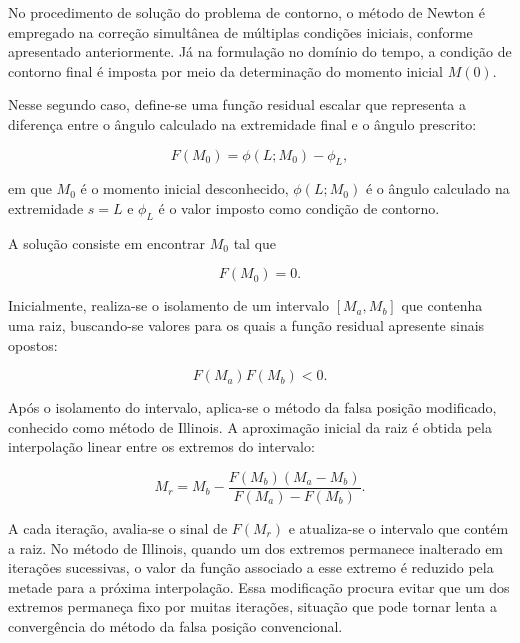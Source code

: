 \documentclass[arial,centeredequations,english,brazilian,oneside,section=TITLE]{ifes8}
\begin{document}
No procedimento de solução do problema de contorno, o método de
Newton é empregado na correção simultânea de múltiplas condições
iniciais, conforme apresentado anteriormente. Já na formulação
no domínio do tempo, a condição de contorno final é imposta por
meio da determinação do momento inicial $M(0)$.

Nesse segundo caso, define-se uma função residual escalar que
representa a diferença entre o ângulo calculado na extremidade
final e o ângulo prescrito:

\begin{equation}
  F(M_0)=\phi(L;M_0)-\phi_L,
  \label{eq:residuo-momento}
\end{equation}

em que $M_0$ é o momento inicial desconhecido, $\phi(L;M_0)$ é
o ângulo calculado na extremidade $s=L$ e $\phi_L$ é o valor
imposto como condição de contorno.

A solução consiste em encontrar $M_0$ tal que

\begin{equation}
  F(M_0)=0.
  \label{eq:condicao-momento}
\end{equation}

Inicialmente, realiza-se o isolamento de um intervalo
$[M_a,M_b]$ que contenha uma raiz, buscando-se valores para os
quais a função residual apresente sinais opostos:

\begin{equation}
  F(M_a)F(M_b)<0.
  \label{eq:intervalo-raiz}
\end{equation}

Após o isolamento do intervalo, aplica-se o método da falsa
posição modificado, conhecido como método de Illinois. A
aproximação inicial da raiz é obtida pela interpolação linear
entre os extremos do intervalo:

\begin{equation}
  M_r =
  M_b -
  \frac{F(M_b)(M_a-M_b)}
  {F(M_a)-F(M_b)}.
  \label{eq:falsa-posicao}
\end{equation}

A cada iteração, avalia-se o sinal de $F(M_r)$ e atualiza-se
o intervalo que contém a raiz. No método de Illinois, quando
um dos extremos permanece inalterado em iterações sucessivas,
o valor da função associado a esse extremo é reduzido pela
metade para a próxima interpolação. Essa modificação procura
evitar que um dos extremos permaneça fixo por muitas iterações,
situação que pode tornar lenta a convergência do método da
falsa posição convencional.
\end{document}
